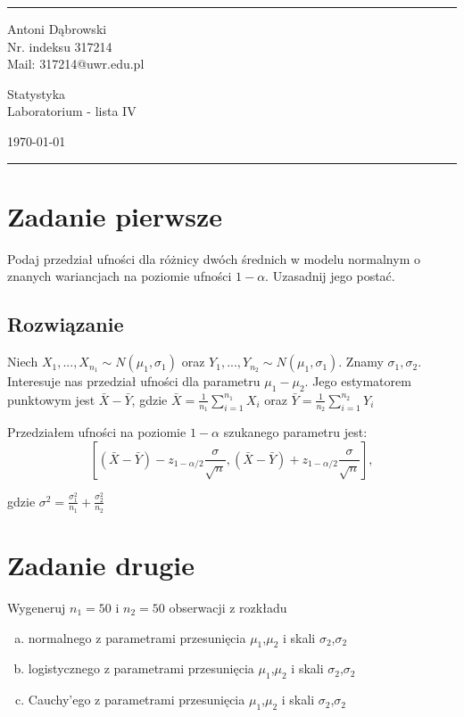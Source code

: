 \documentclass[a4paper]{article}
\begin{document}

\fancyhead[C]{}
\hrule \medskip %
\begin{minipage}{0.295\textwidth} 
\raggedright
\footnotesize
Antoni Dąbrowski \hfill\\   
Nr. indeksu 317214\hfill\\
Mail: 317214@uwr.edu.pl
\end{minipage}
\begin{minipage}{0.4\textwidth} 
\centering 
\large 
Statystyka\\ 
\normalsize 
Laboratorium - lista IV\\ 
\end{minipage}
\begin{minipage}{0.295\textwidth} 
\raggedleft
\today\hfill\\
\end{minipage}
\medskip\hrule 
\bigskip



\section{Zadanie pierwsze}
Podaj przedział ufności dla różnicy dwóch średnich w modelu normalnym o znanych wariancjach na poziomie ufności $1-\alpha$. Uzasadnij jego postać.

\subsection{Rozwiązanie}
Niech $X_1,...,X_{n_1}\sim N(\mu_1,\sigma_1)$ oraz $Y_1,...,Y_{n_2}\sim N(\mu_1,\sigma_1)$. Znamy $\sigma_1, \sigma_2$. Interesuje nas przedział ufności dla parametru $\mu_1-\mu_2$. Jego estymatorem punktowym jest $\bar{X}-\bar{Y}$, gdzie $\bar{X}=\frac{1}{n_1}\sum_{i=1}^{n_1}X_i$ oraz $\bar{Y}=\frac{1}{n_2}\sum_{i=1}^{n_2}Y_i$

Przedziałem ufności na poziomie $1-\alpha$ szukanego parametru jest:
$$[(\bar{X}-\bar{Y})-z_{1-\alpha/2}\frac{\sigma}{\sqrt{n}},(\bar{X}-\bar{Y})+z_{1-\alpha/2}\frac{\sigma}{\sqrt{n}}],$$

gdzie $\sigma^2=\frac{\sigma_1^2}{n_1}+\frac{\sigma_2^2}{n_2}$
\section{Zadanie drugie}
Wygeneruj $n_1=50$ i $n_2=50$ obserwacji z rozkładu
\begin{enumerate}[a.]
	\item normalnego z parametrami przesunięcia $\mu_1$,$\mu_2$ i skali $\sigma_2$,$\sigma_2$
	\item logistycznego z parametrami przesunięcia $\mu_1$,$\mu_2$ i skali $\sigma_2$,$\sigma_2$
	\item Cauchy'ego z parametrami przesunięcia $\mu_1$,$\mu_2$ i skali $\sigma_2$,$\sigma_2$
\end{enumerate}
\end{document}
